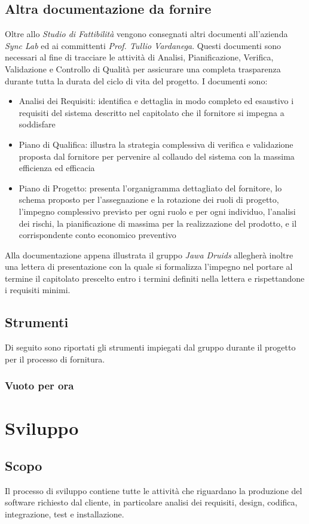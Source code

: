 \subsection{Altra documentazione da fornire}
Oltre allo \emph{Studio di Fattibilità} vengono consegnati altri documenti all'azienda \emph{Sync Lab} ed ai committenti \emph{Prof. Tullio Vardanega}. Questi documenti sono necessari al fine di tracciare le attività di Analisi, Pianificazione, Verifica, Validazione e Controllo di Qualità per assicurare una completa trasparenza durante tutta la durata del ciclo di vita del progetto.
I documenti sono:
\begin{itemize}
	\item Analisi dei Requisiti: identifica e dettaglia in modo completo ed esaustivo i requisiti del sistema descritto nel capitolato che il fornitore si impegna a soddisfare
	\item Piano di Qualifica: illustra la strategia complessiva di verifica e validazione proposta dal fornitore per pervenire al collaudo del sistema con la massima efficienza ed efficacia
	\item Piano di Progetto: presenta l'organigramma dettagliato del fornitore, lo schema proposto per l'assegnazione e la rotazione dei ruoli di progetto, l'impegno complessivo previsto per ogni ruolo e per ogni individuo, l'analisi dei rischi, la pianificazione di massima per la realizzazione del prodotto, e il corrispondente conto economico preventivo
\end{itemize} 
Alla documentazione appena illustrata il gruppo \emph{Jawa Druids} allegherà inoltre una lettera di presentazione con la quale si formalizza l'impegno nel portare al termine il capitolato prescelto entro i termini definiti nella lettera e rispettandone i requisiti minimi.
\subsection{Strumenti}
Di seguito sono riportati gli strumenti impiegati dal gruppo durante il progetto per il processo di fornitura.
\subsubsection{Vuoto per ora}


\section{Sviluppo}
\subsection{Scopo}
Il processo di sviluppo contiene tutte le attività che riguardano la produzione del software richiesto dal cliente, in particolare analisi dei requisiti, design, codifica, integrazione, test e installazione.
